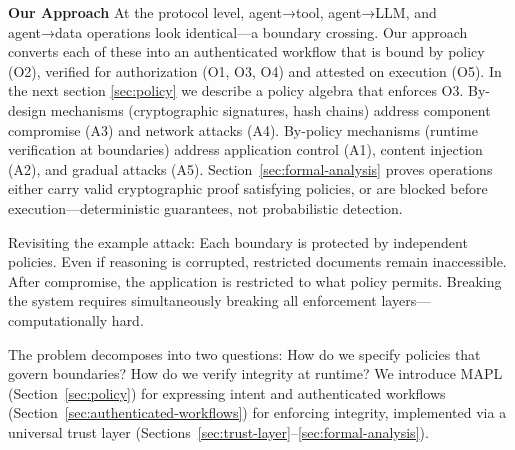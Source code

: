 \textbf{Our Approach} At the protocol level, agent→tool, agent→LLM, and agent→data operations look identical—a boundary crossing. Our approach converts each of these into an authenticated workflow that is bound by policy (O2), verified for authorization (O1, O3, O4) and attested on execution (O5). In the next section \ref{sec:policy} we describe a policy algebra that enforces O3. By-design mechanisms (cryptographic signatures, hash chains) address component compromise (A3) and network attacks (A4). By-policy mechanisms (runtime verification at boundaries) address application control (A1), content injection (A2), and gradual attacks (A5). Section~\ref{sec:formal-analysis} proves operations either carry valid cryptographic proof satisfying policies, or are blocked before execution—deterministic guarantees, not probabilistic detection.

Revisiting the example attack: Each boundary is protected by independent policies. Even if reasoning is corrupted, restricted documents remain inaccessible. After compromise, the application is restricted to what policy permits. Breaking the system requires simultaneously breaking all enforcement layers—computationally hard.

The problem decomposes into two questions: How do we specify policies that govern boundaries? How do we verify integrity at runtime? We introduce MAPL (Section~\ref{sec:policy}) for expressing intent and authenticated workflows (Section~\ref{sec:authenticated-workflows}) for enforcing integrity, implemented via a universal trust layer (Sections~\ref{sec:trust-layer}--\ref{sec:formal-analysis}).
